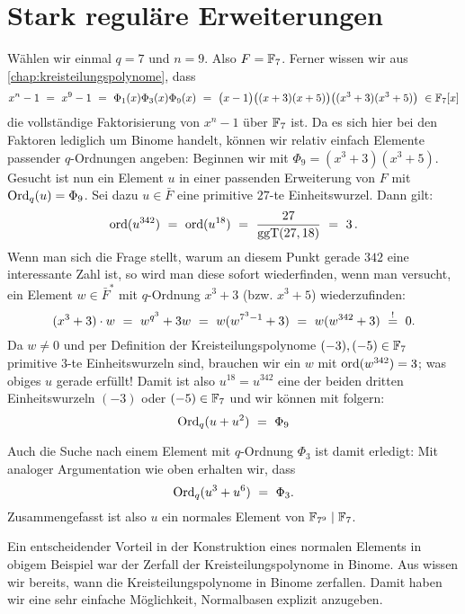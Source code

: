 \section{Stark reguläre Erweiterungen}
\label{sec:stark_regulare_erweiterungen}

\begin{beispiel}
  \label{bsp:stark_regular_1}
  Wählen wir einmal $q = 7$ und $n=9$. Also $F = \mathbb{F}_7$.
  Ferner wissen wir aus \autoref{chap:kreisteilungspolynome}, dass
  \[ x^n-1 \ =\  x^9-1 \ =\  
    \Phi_1(x)\Phi_3(x)\Phi_9(x) \ =\ 
    \big(x-1\big)\big( (x+3)(x+5)\big)
    \big( (x^3+3)(x^3+5) \big) \ \in \mathbb{F}_7[x]\]
  die vollständige Faktorisierung von $x^n-1$ über $\mathbb{F}_7$ ist.
  Da es sich hier bei den Faktoren lediglich um Binome handelt, können wir
  relativ einfach Elemente passender $q$-Ordnungen angeben: Beginnen wir 
  mit $\Phi_9 = (x^3+3)(x^3+5)$. Gesucht ist nun ein Element $u$ in einer 
  passenden Erweiterung von $F$ mit $\operatorname{Ord}_q(u)= \Phi_9$.
  Sei dazu $u \in \bar F$ eine primitive $27$-te Einheitswurzel. Dann
  gilt:
  \[ \operatorname{ord}(u^{342}) \ =\  \operatorname{ord}(u^{18}) \ =\  \frac{27}{\operatorname{ggT}(27,18)} 
    \ =\  3\,.\]
  Wenn man sich die Frage stellt, warum an diesem Punkt gerade $342$ eine
  interessante Zahl ist, so wird man diese sofort wiederfinden, wenn man
  versucht, ein Element $w\in \bar F^\ast$ mit $q$-Ordnung $x^3+3$ (bzw.
  $x^3+5$) wiederzufinden:
  \[ (x^3+3)\cdot w \ =\  w^{q^3} + 3 w \ =\  
    w(w^{7^3-1} +3) \ =\  w(w^{342}+3) \ \overset{!}{=}\  0.\]
  Da $w \neq 0$ und per Definition der Kreisteilungspolynome 
  $(-3),(-5)\in \mathbb{F}_7$ primitive $3$-te Einheitswurzeln sind, 
  brauchen wir ein $w$ mit $\operatorname{ord}(w^{342}) = 3$; 
  was obiges $u$ gerade erfüllt! Damit ist also $u^{18} = u^{342}$ 
  eine der beiden dritten Einheitswurzeln $(-3)$ oder $(-5) \in \mathbb{F}_7$ und wir
  können mit  folgern:
  \[ \operatorname{Ord}_q(u + u^2) \ =\  \Phi_9\]

  Auch die Suche nach einem Element mit $q$-Ordnung $\Phi_3$ ist damit
  erledigt: Mit analoger Argumentation wie oben erhalten wir, dass 
  \[ \operatorname{Ord}_q(u^{3} + u^{6}) \ =\  \Phi_3.\]
  Zusammengefasst ist also $u$ ein normales Element von $\mathbb{F}_{7^9} \mid \mathbb{F}_7$.
\end{beispiel}

Ein entscheidender Vorteil in der Konstruktion eines normalen Elements in
obigem Beispiel war der Zerfall der Kreisteilungspolynome in Binome. Aus 
wissen wir bereits, wann die Kreisteilungspolynome in Binome zerfallen.
Damit haben wir eine sehr einfache Möglichkeit, Normalbasen explizit anzugeben.

